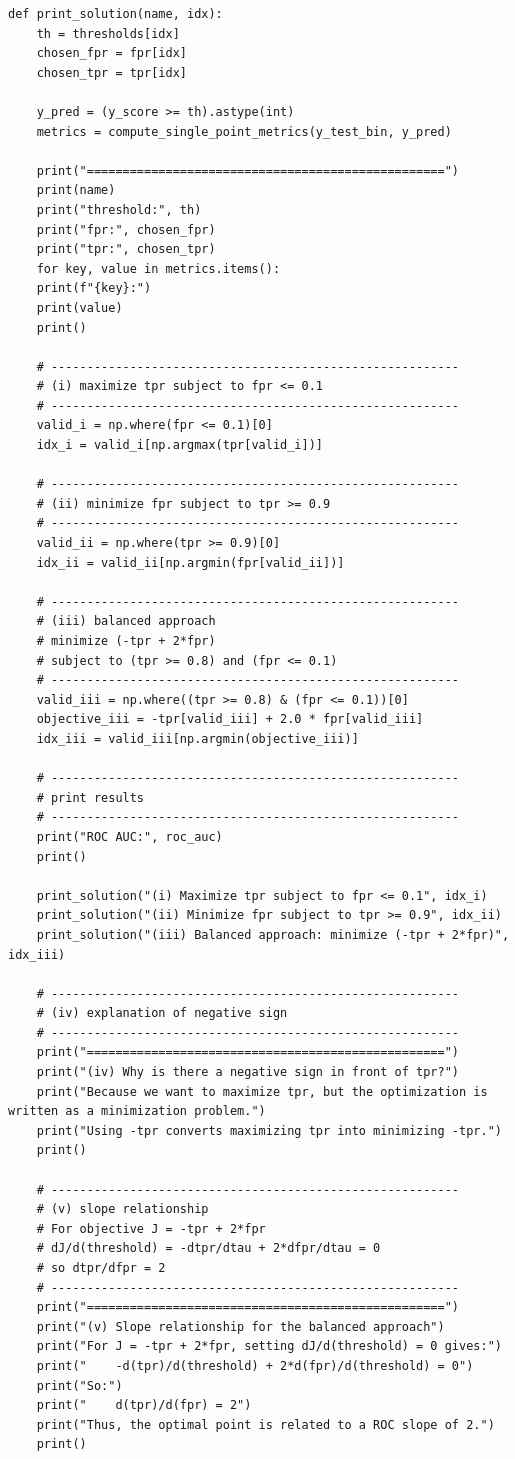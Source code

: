 \documentclass[11pt]{article}
\begin{document}
\begin{lstlisting}[style=matlabstyle]
	def print_solution(name, idx):
	th = thresholds[idx]
	chosen_fpr = fpr[idx]
	chosen_tpr = tpr[idx]
	
	y_pred = (y_score >= th).astype(int)
	metrics = compute_single_point_metrics(y_test_bin, y_pred)
	
	print("==================================================")
	print(name)
	print("threshold:", th)
	print("fpr:", chosen_fpr)
	print("tpr:", chosen_tpr)
	for key, value in metrics.items():
	print(f"{key}:")
	print(value)
	print()
	
	# ---------------------------------------------------------
	# (i) maximize tpr subject to fpr <= 0.1
	# ---------------------------------------------------------
	valid_i = np.where(fpr <= 0.1)[0]
	idx_i = valid_i[np.argmax(tpr[valid_i])]
	
	# ---------------------------------------------------------
	# (ii) minimize fpr subject to tpr >= 0.9
	# ---------------------------------------------------------
	valid_ii = np.where(tpr >= 0.9)[0]
	idx_ii = valid_ii[np.argmin(fpr[valid_ii])]
	
	# ---------------------------------------------------------
	# (iii) balanced approach
	# minimize (-tpr + 2*fpr)
	# subject to (tpr >= 0.8) and (fpr <= 0.1)
	# ---------------------------------------------------------
	valid_iii = np.where((tpr >= 0.8) & (fpr <= 0.1))[0]
	objective_iii = -tpr[valid_iii] + 2.0 * fpr[valid_iii]
	idx_iii = valid_iii[np.argmin(objective_iii)]
	
	# ---------------------------------------------------------
	# print results
	# ---------------------------------------------------------
	print("ROC AUC:", roc_auc)
	print()
	
	print_solution("(i) Maximize tpr subject to fpr <= 0.1", idx_i)
	print_solution("(ii) Minimize fpr subject to tpr >= 0.9", idx_ii)
	print_solution("(iii) Balanced approach: minimize (-tpr + 2*fpr)", idx_iii)
	
	# ---------------------------------------------------------
	# (iv) explanation of negative sign
	# ---------------------------------------------------------
	print("==================================================")
	print("(iv) Why is there a negative sign in front of tpr?")
	print("Because we want to maximize tpr, but the optimization is written as a minimization problem.")
	print("Using -tpr converts maximizing tpr into minimizing -tpr.")
	print()
	
	# ---------------------------------------------------------
	# (v) slope relationship
	# For objective J = -tpr + 2*fpr
	# dJ/d(threshold) = -dtpr/dtau + 2*dfpr/dtau = 0
	# so dtpr/dfpr = 2
	# ---------------------------------------------------------
	print("==================================================")
	print("(v) Slope relationship for the balanced approach")
	print("For J = -tpr + 2*fpr, setting dJ/d(threshold) = 0 gives:")
	print("    -d(tpr)/d(threshold) + 2*d(fpr)/d(threshold) = 0")
	print("So:")
	print("    d(tpr)/d(fpr) = 2")
	print("Thus, the optimal point is related to a ROC slope of 2.")
	print()
	

\end{lstlisting}
\end{document}
